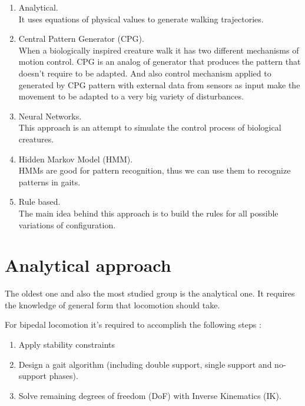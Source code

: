 \documentclass[12pt,a4paper]{report}
\begin{document}
		\begin{enumerate}
			\item Analytical.\\ It uses equations of physical values to generate walking trajectories.
			\item Central Pattern Generator (CPG).\\ When a biologically inspired creature walk it has two different mechanisms of motion control. CPG is an analog of generator that produces the pattern that doesn't require to be adapted. And also control mechanism applied to generated by CPG pattern with external data from sensors as input make the movement to be adapted to a very big variety of disturbances.
			\item Neural Networks.\\ This approach is an attempt to simulate the control process of biological creatures.
			\item Hidden Markov Model (HMM).\\ HMMs are good for pattern recognition, thus we can use them to recognize patterns in gaits.
			\item Rule based.\\ The main idea behind this approach is to build the rules for all possible variations of configuration.
		\end{enumerate}

		\section{Analytical approach}
		The oldest one and also the most studied group is the analytical one. It requires the knowledge of general form that locomotion should take.

		For bipedal locomotion it's required to accomplish the following steps \cite{wright2014intelligent}:
		\begin{enumerate}
			\item Apply stability constraints
			\item Design a gait algorithm (including double support, single support and no-support phases).
			\item Solve remaining degrees of freedom (DoF) with Inverse Kinematics (IK).
		\end{enumerate}
\end{document}
